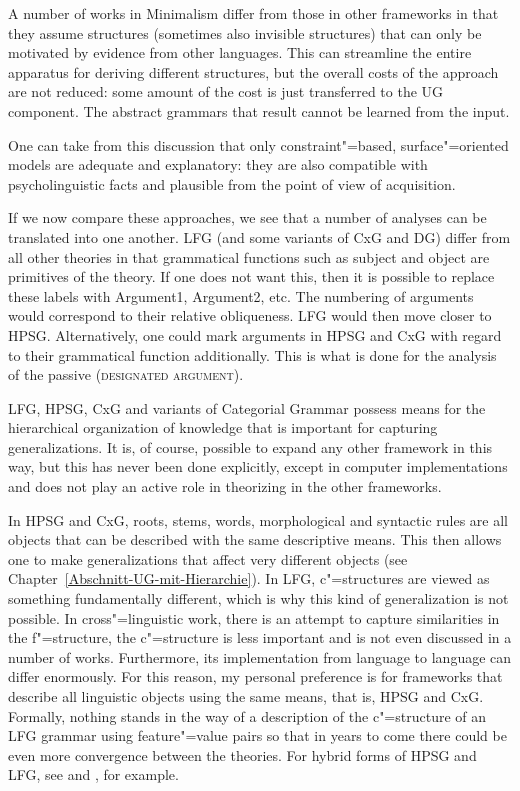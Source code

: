 A number of works in Minimalism differ from those in other frameworks in that they assume structures (sometimes also invisible structures) that can only be motivated
by evidence from other languages. This can streamline the entire apparatus for deriving
different structures, but the overall costs of the approach are not reduced: some amount of the
cost is just transferred to the UG component. The abstract grammars that result cannot be learned from the input.

One can take from this discussion that only constraint"=based, surface"=oriented models are adequate
and explanatory: they are also compatible with psycholinguistic facts and plausible from the point of view of acquisition.

If we now compare these approaches, we see that a number of analyses can be translated into one
another. LFG (and some variants of CxG and DG) differ from all other theories in that grammatical
functions such as subject and object are primitives of the theory. If one does not want this, then it is possible to replace these labels with Argument1, Argument2,
etc. The numbering of arguments would correspond to their relative obliqueness. LFG would then move
closer to HPSG. Alternatively, one could mark arguments in HPSG and CxG with regard to their grammatical function additionally. This is what is done for the analysis of the passive (\textsc{designated argument}).

LFG, HPSG, CxG and variants of Categorial Grammar \citep{MCKRZ89a-u,Briscoe2000a,Villavicencio2002a}
possess means for the hierarchical organization of knowledge that is important for capturing generalizations.
It is, of course, possible to expand any other framework in this way, but this has never been done
explicitly, except in computer implementations and does not play an active role in theorizing in the other frameworks.

In HPSG and CxG, roots, stems, words, morphological and syntactic rules are all objects that can be described with the same descriptive
means. This then allows one to make generalizations that affect very different objects (see Chapter~\ref{Abschnitt-UG-mit-Hierarchie}).  
In LFG, c"=structures are viewed as something fundamentally different, which is why this kind of generalization is not possible. In cross"=linguistic
work, there is an attempt to capture similarities in the f"=structure, the c"=structure is less important and is not even discussed in a number of
works. Furthermore, its implementation from language to language can differ enormously. For this reason, my personal preference is for frameworks
that describe all linguistic objects using the same means, that is, HPSG and CxG. Formally, nothing stands in the way of a description of the c"=structure
of an LFG grammar using feature"=value pairs so that in years to come there could be even more
convergence between the theories. For hybrid forms of HPSG and LFG, see  and , for example.

